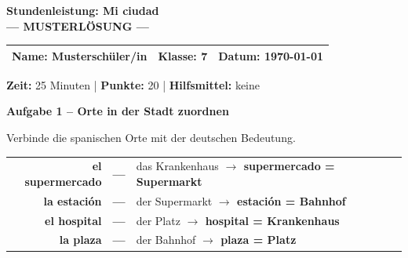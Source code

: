 \documentclass[11pt, a4paper]{article}
\newcommand{\fachfarbe}{spanisch}
\newcommand{\thema}{Stundenleistung: Mi ciudad}
\newcommand{\klasse}{7}
\newcommand{\maxpunkte}{20}
\newcommand{\zeit}{25 Minuten}
\newcommand{\datum}{\today}
\newcommand{\punktebox}[1]{\hfill\fbox{\small \_/#1}}
\newcommand{\lsg}[1]{\textcolor{loesung}{\textbf{#1}}}
\newenvironment{aufgabe}[1]{%
    \needspace{5\baselineskip}%
    \nopagebreak[4]%
    \vspace{10pt}
    \noindent\textbf{\textcolor{\fachfarbe}{Aufgabe #1}}
    \nopagebreak[4]%
    \vspace{5pt}
    \nopagebreak[4]%
    \begin{list}{}{\leftmargin=0pt}
    \item[]
}{%
    \end{list}
}
\newcommand{\es}[1]{\textcolor{\fachfarbe}{\textbf{#1}}}
\begin{document}
\begin{center}
    {\Large\bfseries\textcolor{\fachfarbe}{\thema}}\\[0.3em]
    {\large\textcolor{loesung}{\textbf{--- MUSTERLÖSUNG ---}}}
\end{center}

\vspace{5pt}

\noindent
\begin{tabularx}{\textwidth}{|X|X|X|}
\hline
\textbf{Name:} \lsg{Musterschüler/in} &
\textbf{Klasse:} \klasse &
\textbf{Datum:} \datum \\
\hline
\end{tabularx}

\vspace{10pt}

\begin{infobox}
\textbf{Zeit:} \zeit{} | \textbf{Punkte:} \maxpunkte{} | \textbf{Hilfsmittel:} keine
\end{infobox}

\vspace{15pt}


\begin{aufgabe}{1 -- Orte in der Stadt zuordnen}
Verbinde die spanischen Orte mit der deutschen Bedeutung. \punktebox{4}
\end{aufgabe}

\begin{center}
\begin{tabular}{rcl}
\es{el supermercado} & \lsg{---} & das Krankenhaus \lsg{$\rightarrow$ supermercado = Supermarkt} \\[0.8em]
\es{la estación} & \lsg{---} & der Supermarkt \lsg{$\rightarrow$ estación = Bahnhof} \\[0.8em]
\es{el hospital} & \lsg{---} & der Platz \lsg{$\rightarrow$ hospital = Krankenhaus} \\[0.8em]
\es{la plaza} & \lsg{---} & der Bahnhof \lsg{$\rightarrow$ plaza = Platz} \\
\end{tabular}
\end{center}

\vspace{15pt}

\end{document}
